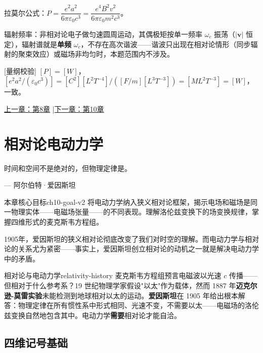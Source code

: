\documentclass[11pt,a4paper,openany,oneside]{book}
\newcommand{\eps}{\varepsilon}
\newcommand{\vect}[1]{\bm{#1}}
\begin{document}
拉莫尔公式：$P = \dfrac{e^2 a^2}{6\pi\eps_0 c^3} = \dfrac{e^4 B^2 v^2}{6\pi\eps_0 m^2 c^3}$。

辐射频率：非相对论电子做匀速圆周运动，其偶极矩按单一频率 $\omega_c$ 振荡（$|\vect{v}|$ 恒定），辐射谱就是\textbf{单频} $\omega_c$，不存在高次谐波——谐波只出现在相对论情形（同步辐射的聚束效应）或磁场非均匀时，本题范围内不涉及。\qedsymbol

[量纲校验] $[P] = [W]$，$[e^2 a^2/(\eps_0 c^3)] = [C^2][L^2T^{-4}]/([F/m][L^3T^{-3}]) = [ML^2T^{-3}] = [W]$，一致。\qedsymbol




\begin{center}\small \hyperlink{ch8-goal}{上一章：第8章} \quad|\quad \hyperlink{ch10-goal}{下一章：第10章}\end{center}

\chapter{相对论电动力学}
\epigraph{时间和空间不是绝对的，但物理定律是。}{--- 阿尔伯特·爱因斯坦}

\hypertarget{ch10-goal}{}\begin{insight}{本章核心目标}{ch10-goal-v2}
将电动力学纳入狭义相对论框架，揭示电场和磁场是同一物理实体——电磁场张量——的不同表现。理解洛伦兹变换下的场变换规律，掌握四维形式的麦克斯韦方程组。
\end{insight}

1905年，爱因斯坦的狭义相对论彻底改变了我们对时空的理解。而电动力学与相对论的关系尤为紧密——事实上，爱因斯坦创立相对论的动机之一就是解决电动力学中的矛盾。

\begin{history}{相对论与电动力学}{relativity-history}
麦克斯韦方程组预言电磁波以光速 $c$ 传播——但相对于什么参考系？19 世纪物理学家假设"以太"作为载体，然而 1887 年\textbf{迈克尔逊-莫雷实验}未能检测到地球相对以太的运动。\textbf{爱因斯坦}在 1905 年给出根本解答：物理定律在所有惯性系中形式相同、光速不变，不需要以太——电磁场的洛伦兹变换自然地包含其中。电动力学\textbf{需要}相对论才能自洽。
\end{history}

\section{四维记号基础}
\end{document}
